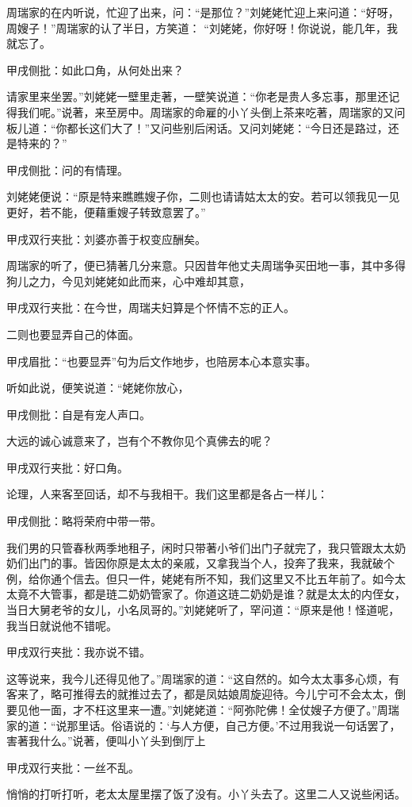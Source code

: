 \begin{parag}
    周瑞家的在内听说，忙迎了出来，问：“是那位？”刘姥姥忙迎上来问道：“好呀，周嫂子！”周瑞家的认了半日，方笑道： “刘姥姥，你好呀！你说说，能几年，我就忘了。\begin{note}甲戌侧批：如此口角，从何处出来？\end{note}请家里来坐罢。”刘姥姥一壁里走著，一壁笑说道：“你老是贵人多忘事，那里还记得我们呢。”说著，来至房中。周瑞家的命雇的小丫头倒上茶来吃著，周瑞家的又问板儿道：“你都长这们大了！”又问些别后闲话。又问刘姥姥：“今日还是路过，还是特来的？”\begin{note}甲戌侧批：问的有情理。\end{note}刘姥姥便说：“原是特来瞧瞧嫂子你，二则也请请姑太太的安。若可以领我见一见更好，若不能，便藉重嫂子转致意罢了。”\begin{note}甲戌双行夹批：刘婆亦善于权变应酬矣。\end{note}
\end{parag}


\begin{parag}
    周瑞家的听了，便已猜著几分来意。只因昔年他丈夫周瑞争买田地一事，其中多得狗儿之力，今见刘姥姥如此而来，心中难却其意，\begin{note}甲戌双行夹批：在今世，周瑞夫妇算是个怀情不忘的正人。\end{note}二则也要显弄自己的体面。\begin{note}甲戌眉批：“也要显弄”句为后文作地步，也陪房本心本意实事。\end{note}听如此说，便笑说道：“姥姥你放心，\begin{note}甲戌侧批：自是有宠人声口。\end{note}大远的诚心诚意来了，岂有个不教你见个真佛去的呢？\begin{note}甲戌双行夹批：好口角。\end{note}论理，人来客至回话，却不与我相干。我们这里都是各占一样儿：\begin{note}甲戌侧批：略将荣府中带一带。\end{note}我们男的只管春秋两季地租子，闲时只带著小爷们出门子就完了，我只管跟太太奶奶们出门的事。皆因你原是太太的亲戚，又拿我当个人，投奔了我来，我就破个例，给你通个信去。但只一件，姥姥有所不知，我们这里又不比五年前了。如今太太竟不大管事，都是琏二奶奶管家了。你道这琏二奶奶是谁？就是太太的内侄女，当日大舅老爷的女儿，小名凤哥的。”刘姥姥听了，罕问道：“原来是他！怪道呢，我当日就说他不错呢。\begin{note}甲戌双行夹批：我亦说不错。\end{note}这等说来，我今儿还得见他了。”周瑞家的道：“这自然的。如今太太事多心烦，有客来了，略可推得去的就推过去了，都是凤姑娘周旋迎待。今儿宁可不会太太，倒要见他一面，才不枉这里来一遭。”刘姥姥道：“阿弥陀佛！全仗嫂子方便了。”周瑞家的道：“说那里话。俗语说的：‘与人方便，自己方便。’不过用我说一句话罢了，害著我什么。”说著，便叫小丫头到倒厅上\begin{note}甲戌双行夹批：一丝不乱。\end{note}悄悄的打听打听，老太太屋里摆了饭了没有。小丫头去了。这里二人又说些闲话。
\end{parag}


